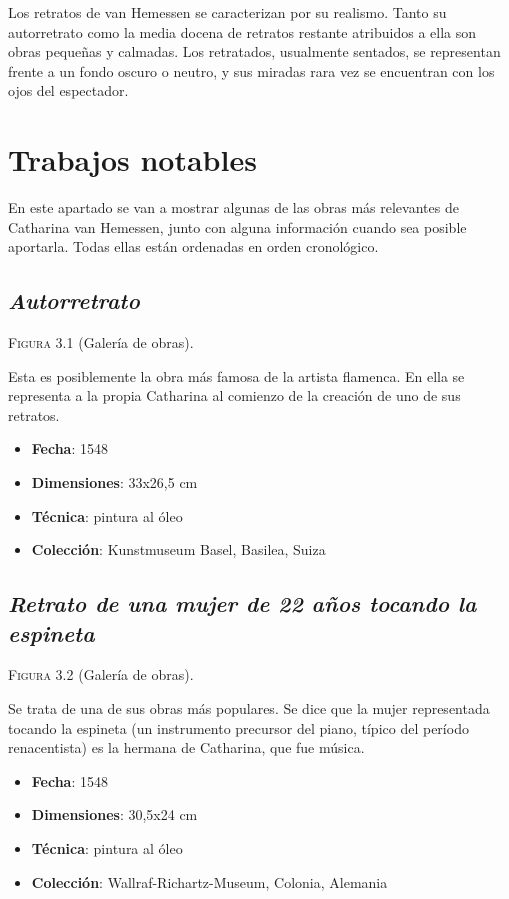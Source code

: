 \documentclass[12pt]{book}
\begin{document}
Los retratos de van Hemessen se caracterizan por su realismo. Tanto su autorretrato como la media docena de retratos restante atribuidos a ella son obras pequeñas y calmadas. Los retratados, usualmente sentados, se representan frente a un fondo oscuro o neutro, y sus miradas rara vez se encuentran con los ojos del espectador.\bigskip

\chapter{Trabajos notables}

En este apartado se van a mostrar algunas de las obras más relevantes de Catharina van Hemessen, junto con alguna información cuando sea posible aportarla. Todas ellas están ordenadas en orden cronológico.

\section{\textit{Autorretrato}}

\textsc{Figura 3.1} (Galería de obras).\bigskip

Esta es posiblemente la obra más famosa de la artista flamenca. En ella se representa a la propia Catharina al comienzo de la creación de uno de sus retratos.
\begin{itemize}
	\item \textbf{Fecha}: 1548
	\item \textbf{Dimensiones}: 33x26,5 cm
	\item \textbf{Técnica}: pintura al óleo
	\item \textbf{Colección}: Kunstmuseum Basel, Basilea, Suiza
\end{itemize}

\section{\textit{Retrato de una mujer de 22 años tocando la espineta}}

\textsc{Figura 3.2} (Galería de obras).\bigskip

Se trata de una de sus obras más populares. Se dice que la mujer representada tocando la espineta (un instrumento precursor del piano, típico del período renacentista) es la hermana de Catharina, que fue música.
\begin{itemize}
	\item \textbf{Fecha}: 1548
	\item \textbf{Dimensiones}: 30,5x24 cm
	\item \textbf{Técnica}: pintura al óleo
	\item \textbf{Colección}: Wallraf-Richartz-Museum, Colonia, Alemania
\end{itemize}
\end{document}
